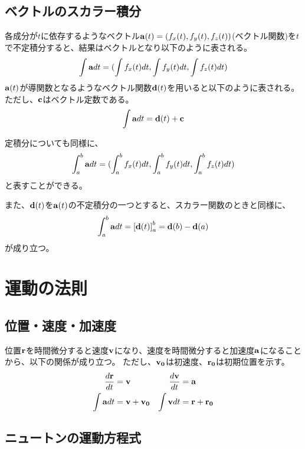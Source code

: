 \documentclass{ltjsreport}
\begin{document}
\section{ベクトルのスカラー積分}

各成分が$t$に依存するようなベクトル$\vb{a}(t)=(f_x(t),f_y(t),f_z(t))$(ベクトル関数)を$t$で不定積分すると、結果はベクトルとなり以下のように表される。
\begin{equation}
    \int\vb{a}dt = (\int f_x(t)dt, \int f_y(t)dt, \int f_z(t)dt)
\end{equation}
$\vb{a}(t)$が導関数となるようなベクトル関数$\vb{d}(t)$を用いると以下のように表される。
ただし、$\vb{c}$はベクトル定数である。
\begin{equation}
    \int\vb{a}dt = \vb{d}(t)+\vb{c}
\end{equation}

定積分についても同様に、
\begin{equation}
    \int_a^b\vb{a}dt = (\int_a^b f_x(t)dt, \int_a^b f_y(t)dt, \int_a^b f_z(t)dt)
\end{equation}
と表すことができる。

また、$\vb{d}(t)$を$\vb{a}(t)$の不定積分の一つとすると、スカラー関数のときと同様に、
\begin{equation}
    \int_a^b\vb{a}dt = \left[ \vb{d}(t) \right]_a^b = \vb{d}(b)-\vb{d}(a)
\end{equation}
が成り立つ。

\chapter{運動の法則}

\section{位置・速度・加速度}

位置$\vb{r}$を時間微分すると速度$\vb{v}$になり、速度を時間微分すると加速度$\vb{a}$になることから、以下の関係が成り立つ。
ただし、$\vb{v_0}$は初速度、$\vb{r_0}$は初期位置を示す。
\begin{align}
    \frac{d\vb{r}}{dt} &= \vb{v} & \frac{d\vb{v}}{dt} &= \vb{a} \\
    \int\vb{a}dt &= \vb{v}+\vb{v_0} & \int\vb{v}dt &= \vb{r}+\vb{r_0}
\end{align}

\section{ニュートンの運動方程式}
\end{document}

